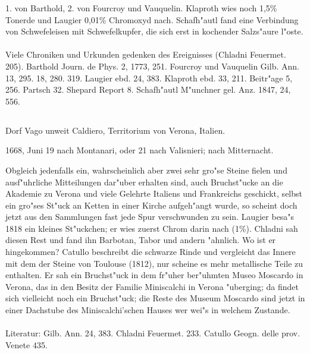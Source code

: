 \documentclass[a4paper, 11pt, oneside]{article}
\begin{document}
1. von Barthold, 2. von Fourcroy und Vauquelin. Klaproth wies noch 1,5\% Tonerde und Laugier 0,01\% Chromoxyd nach. Schafh"autl fand eine Verbindung von Schwefeleisen mit Schwefelkupfer, die sich erst in kochender Salzs"aure l"oste.
\normalsize
\paragraph{}
Viele Chroniken und Urkunden gedenken des Ereignisses (Chladni Feuermet. 205). Barthold Journ. de Phys. 2, 1773, 251. Fourcroy und Vauquelin Gilb. Ann. 13, 295. 18, 280. 319. Laugier ebd. 24, 383. Klaproth ebd. 33, 211. Beitr"age 5, 256. Partsch 32. Shepard Report 8. Schafh"autl M"unchner gel. Anz. 1847, 24, 556.
\subsection{}
\LARGE
\paragraph{}
Dorf Vago unweit Caldiero, Territorium von Verona, Italien.

1668, Juni 19 nach Montanari, oder 21 nach Valisnieri; nach Mitternacht.

Obgleich jedenfalls ein, wahrscheinlich aber zwei sehr gro"se Steine fielen und ausf"uhrliche Mitteilungen dar"uber erhalten sind, auch Bruchst"ucke an die Akademie zu Verona und viele Gelehrte Italiens und Frankreichs geschickt, selbst ein gro"ses St"uck an Ketten in einer Kirche aufgeh"angt wurde, so scheint doch jetzt aus den Sammlungen fast jede Spur verschwunden zu sein. Laugier besa"s 1818 ein kleines St"uckchen; er wies zuerst Chrom darin nach (1\%). Chladni sah diesen Rest und fand ihn Barbotan, Tabor und andern "ahnlich. Wo ist er hingekommen? Catullo beschreibt die schwarze Rinde und vergleicht das Innere mit dem der Steine von Toulouse (1812), nur scheine es mehr metallische Teile zu enthalten. Er sah ein Bruchst"uck in dem fr"uher ber"uhmten Museo Moscardo in Verona, das in den Besitz der Familie Miniscalchi in Verona "uberging; da findet sich vielleicht noch ein Bruchst"uck; die Reste des Museum Moscardo sind jetzt in einer Dachstube des Miniscalchi'schen Hauses wer wei"s in welchem Zustande.
\normalsize
\paragraph{}
Literatur: Gilb. Ann. 24, 383. Chladni Feuermet. 233. Catullo Geogn. delle prov. Venete 435.
\end{document}
